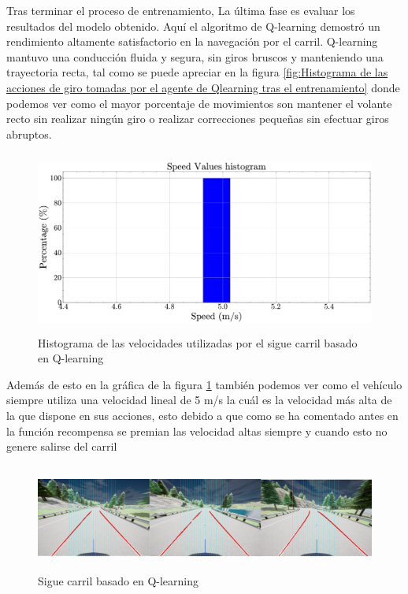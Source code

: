 Tras terminar el proceso de entrenamiento, La última fase es evaluar los resultados del modelo obtenido. Aquí el algoritmo de Q-learning demostró un rendimiento altamente satisfactorio en la navegación por el carril. Q-learning mantuvo una conducción fluida y segura, sin giros bruscos y manteniendo una trayectoria recta, tal como se puede apreciar en la figura \ref{fig:Histograma de las acciones de giro tomadas por el agente de Qlearning tras el entrenamiento} donde podemos ver como el mayor porcentaje de movimientos son mantener el volante recto sin realizar ningún giro o realizar correcciones pequeñas sin efectuar giros abruptos.
  \begin{figure}[h]
    \centering
    \includegraphics[height=6cm]{imagenes/cap4/sigue_carriles_qlearning/speeds.pdf}
    \caption{Histograma de las velocidades utilizadas por el sigue carril basado en Q-learning}
    \label{fig:Histograma de las velocidades utilizadas por el agente de Qlearning tras el entrenamiento}
\end{figure}

Además de esto en la gráfica de la figura \ref{fig:Histograma de las velocidades utilizadas por el agente de Qlearning tras el entrenamiento} también podemos ver como el vehículo siempre utiliza una velocidad lineal de 5 m/s la cuál es la velocidad más alta de la que dispone en sus acciones, esto debido a que como se ha comentado antes en la función recompensa se premian las velocidad altas siempre y cuando esto no genere salirse del carril


  \begin{figure}[h]
    \centering
    \includegraphics[height=3.5cm]{imagenes/cap4/demostraciones_qlearning/normal/demostracion_qlearning.pdf}
    \caption{Sigue carril basado en Q-learning}
    \label{fig:Sigue carriles basado en Qlearning}
\end{figure}


